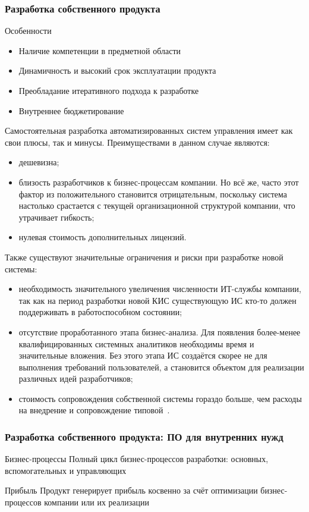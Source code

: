 \documentclass{../industrial-development}
\begin{document}
\begin{frame} \frametitle{Разработка собственного продукта}
	\begin{block}{Особенности}
		\begin{itemize}
			\item Наличие компетенции в предметной области
			\item Динамичность и высокий срок эксплуатации продукта
			\item Преобладание итеративного подхода к разработке
			\item Внутреннее бюджетирование
		\end{itemize}
	\end{block}
\end{frame}

\lecturenotes

Самостоятельная разработка автоматизированных систем управления имеет как свои плюсы, так и минусы. Преимуществами в данном случае являются:
\begin{itemize}
\item дешевизна;
\item близость разработчиков к бизнес-процессам компании. Но всё же, часто этот фактор из положительного становится отрицательным, поскольку система настолько срастается с текущей организационной структурой компании, что утрачивает гибкость;
\item нулевая стоимость дополнительных лицензий.
\end{itemize}

Также существуют значительные ограничения и риски при разработке новой системы:
\begin{itemize}
\item необходимость значительного увеличения численности ИТ-службы компании, так как на период разработки новой КИС существующую ИС кто-то должен поддерживать в работоспособном состоянии;
\item отсутствие проработанного этапа бизнес-анализа. Для появления более-менее квалифицированных системных аналитиков необходимы время и значительные вложения. Без этого этапа ИС создаётся скорее не для выполнения требований пользователей, а становится объектом для реализации различных идей разработчиков;
\item стоимость сопровождения собственной системы гораздо больше, чем расходы на внедрение и сопровождение типовой~\cite{Lektsii}.
\end{itemize}


\begin{frame} \frametitle{Разработка собственного продукта: ПО для внутренних нужд}
	\begin{block}{Бизнес-процессы}
		Полный цикл бизнес-процессов разработки: основных, вспомогательных и управляющих
	\end{block}
	\begin{block}{Прибыль}
		Продукт генерирует прибыль косвенно за счёт оптимизации бизнес-процессов компании или их реализации
	\end{block}
\end{frame}
\end{document}
